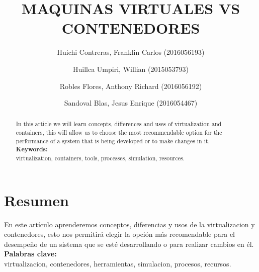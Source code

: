 \documentclass[preprint,12pt]{elsarticle}
\begin{document}
	
	\begin{frontmatter} 

		\title{\huge MAQUINAS VIRTUALES VS CONTENEDORES}
		
		\author{Huichi Contreras, Franklin Carlos            (2016056193)}
		\author{Huillca Umpiri, Willian              		  (2015053793)}
		\author{Robles Flores, Anthony Richard              (2016056192)} 
		\author{Sandoval Blas, Jesus Enrique              (2016054467)} 
		\address{Escuela Profesional de Ingeniería de Sistemas}
		\address{Universidad Privada de Tacna}
		\address{Tacna, Perú}
		

		\begin{abstract}
In this article we will learn concepts, differences and uses of virtualization and containers, this will allow us to choose the most recommendable option for the performance of a system that is being developed or to make changes in it.\\
\textbf{Keywords:}  \\
 virtualization, containers, tools, processes, simulation, resources.\\

		\end{abstract}


	\end{frontmatter}


\section{Resumen}


En este artículo aprenderemos conceptos, diferencias y usos de la virtualizacion y contenedores, esto nos permitirá elegir la opción más recomendable para el desempeño de un sistema que se esté desarrollando o para realizar cambios en él.\\

\textbf{Palabras clave:}   \\
virtualizacion, contenedores, herramientas, simulacion, procesos, recursos.\\
\end{document}
